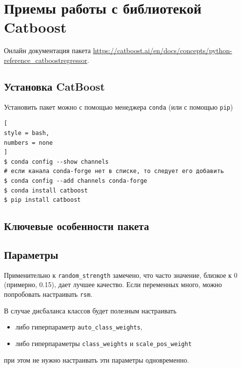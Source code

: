 \documentclass[%
	11pt,
	a4paper,
	utf8,
		]{article}
\begin{document}
\section{Приемы работы с библиотекой Catboost}

Онлайн документация пакета \url{https://catboost.ai/en/docs/concepts/python-reference_catboostregressor}.

\subsection{Установка CatBoost}

Установить пакет можно с помощью менеджера \texttt{conda} (или с помощью \texttt{pip})
\begin{lstlisting}[
style = bash,
numbers = none
]
$ conda config --show channels
# если канала conda-forge нет в списке, то следует его добавить 
$ conda config --add channels conda-forge
$ conda install catboost
$ pip install catboost
\end{lstlisting}

\subsection{Ключевые особенности пакета}

\subsection{Параметры}


Применительно к \texttt{random\_strength} замечено, что часто значение, близкое к 0 (примерно, 0.15), дает лучшее качество. Если переменных много, можно попробовать настраивать \texttt{rsm}.

В случае дисбаланса классов будет полезным настраивать
\begin{itemize}
	\item либо гиперпараметр \texttt{auto\_class\_weights},
	
	\item либо гиперпараметры \texttt{class\_weights} и \texttt{scale\_pos\_weight}
\end{itemize}
при этом не нужно настраивать эти параметры одновременно.
\end{document}
